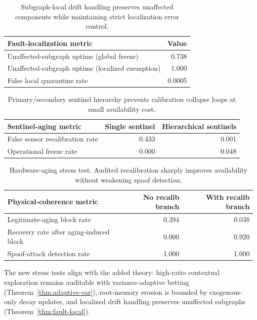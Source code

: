 \documentclass[11pt,a4paper]{article}
\begin{document}
\begin{table}[t]
\centering
\small
\begin{tabular}{lr}
\toprule
Fault-localization metric & Value \\
\midrule
Unaffected-subgraph uptime (global freeze) & 0.738 \\
Unaffected-subgraph uptime (localized exemption) & 1.000 \\
False local quarantine rate & 0.0005 \\
\bottomrule
\end{tabular}
\caption{Subgraph-local drift handling preserves unaffected components while maintaining strict localization error control.}
\end{table}

\begin{table}[H]
\centering
\small
\begin{tabular}{lrr}
\toprule
Sentinel-aging metric & Single sentinel & Hierarchical sentinels \\
\midrule
False sensor recalibration rate & 0.433 & 0.001 \\
Operational freeze rate & 0.000 & 0.048 \\
\bottomrule
\end{tabular}
\caption{Primary/secondary sentinel hierarchy prevents calibration collapse loops at small availability cost.}
\end{table}

\begin{table}[H]
\centering
\small
\begin{tabular}{lrr}
\toprule
Physical-coherence metric & No recalib branch & With recalib branch \\
\midrule
Legitimate-aging block rate & 0.394 & 0.038 \\
Recovery rate after aging-induced block & 0.000 & 0.920 \\
Spoof-attack detection rate & 1.000 & 1.000 \\
\bottomrule
\end{tabular}
\caption{Hardware-aging stress test. Audited recalibration sharply improves availability without weakening spoof detection.}
\end{table}

The new stress tests align with the added theory: high-ratio contextual exploration remains auditable with variance-adaptive betting (Theorem~\ref{thm:adaptive-var}), root-memory erosion is bounded by exogenous-only decay updates, and localized drift handling preserves unaffected subgraphs (Theorem~\ref{thm:fault-local}).
\end{document}
